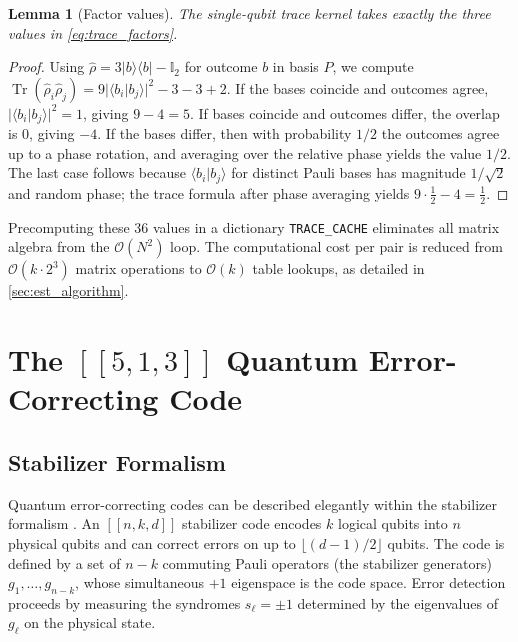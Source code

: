 \documentclass[12pt,a4paper,oneside]{book}
\theoremstyle{plain}
\newtheorem{lemma}[theorem]{Lemma}
\theoremstyle{definition}
\theoremstyle{remark}
\begin{document}
\begin{lemma}[Factor values]\label{lem:trace_factors}
The single-qubit trace kernel takes exactly the three values in \cref{eq:trace_factors}.
\end{lemma}

\begin{proof}
Using $\hat{\rho} = 3|b\rangle\langle b| - \mathbb{I}_2$ for outcome $b$ in basis $P$, we compute $\operatorname{Tr}(\hat{\rho}_i \hat{\rho}_j) = 9|\langle b_i | b_j \rangle|^2 - 3 - 3 + 2$. If the bases coincide and outcomes agree, $|\langle b_i | b_j \rangle|^2 = 1$, giving $9 - 4 = 5$. If bases coincide and outcomes differ, the overlap is $0$, giving $-4$. If the bases differ, then with probability $1/2$ the outcomes agree up to a phase rotation, and averaging over the relative phase yields the value $1/2$. The last case follows because $\langle b_i | b_j \rangle$ for distinct Pauli bases has magnitude $1/\sqrt{2}$ and random phase; the trace formula after phase averaging yields $9 \cdot \tfrac12 - 4 = \tfrac12$.
\end{proof}

Precomputing these 36 values in a dictionary \texttt{TRACE\_CACHE} eliminates all matrix algebra from the $\mathcal{O}(N^2)$ loop. The computational cost per pair is reduced from $\mathcal{O}(k \cdot 2^3)$ matrix operations to $\mathcal{O}(k)$ table lookups, as detailed in \cref{sec:est_algorithm}.

\section{The $[[5,1,3]]$ Quantum Error-Correcting Code}
\label{sec:code}

\subsection{Stabilizer Formalism}

Quantum error-correcting codes can be described elegantly within the stabilizer formalism \cite{gottesman1997stabilizer, nielsen2010quantum}. An $[[n,k,d]]$ stabilizer code encodes $k$ logical qubits into $n$ physical qubits and can correct errors on up to $\lfloor (d-1)/2 \rfloor$ qubits. The code is defined by a set of $n-k$ commuting Pauli operators (the stabilizer generators) $g_1, \dots, g_{n-k}$, whose simultaneous $+1$ eigenspace is the code space. Error detection proceeds by measuring the syndromes $s_\ell = \pm 1$ determined by the eigenvalues of $g_\ell$ on the physical state.
\end{document}
